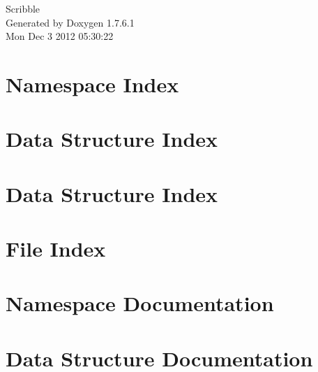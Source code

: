 \documentclass[a4paper]{book}
\begin{document}
\hypersetup{pageanchor=false,citecolor=blue}
\begin{titlepage}
\vspace*{7cm}
\begin{center}
{\Large \-Scribble }\\
\vspace*{1cm}
{\large \-Generated by Doxygen 1.7.6.1}\\
\vspace*{0.5cm}
{\small Mon Dec 3 2012 05:30:22}\\
\end{center}
\end{titlepage}
\clearemptydoublepage
{}
\tableofcontents
\clearemptydoublepage
{}
\hypersetup{pageanchor=true,citecolor=blue}
\chapter{\-Namespace \-Index}

\chapter{\-Data \-Structure \-Index}

\chapter{\-Data \-Structure \-Index}

\chapter{\-File \-Index}

\chapter{\-Namespace \-Documentation}

\chapter{\-Data \-Structure \-Documentation}















\end{document}
